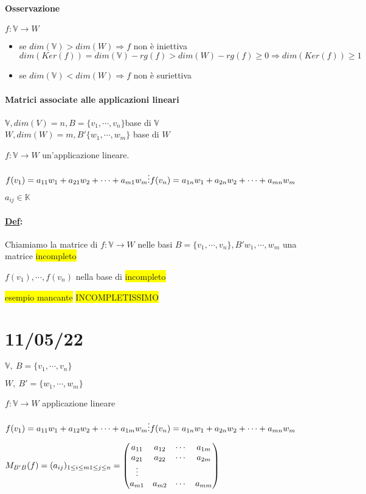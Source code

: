 \documentclass{article}
\newcommand{\hl}[1]{\colorbox{yellow}{#1}}
\newcommand{\ul}[1]{\underline{#1}}
\newcommand{\K}{\mathbb{K}}
\newcommand{\V}{\mathbb{V}}
\newcommand{\Def}[2]{\paragraph{\ul{Def}:}#1\\\hspace*{3em}\begin{minipage}{.8\textwidth}#2\end{minipage}}
\begin{document}
\paragraph{Osservazione}

$f:\V\rightarrow W$
\begin{itemize}
	\item se $dim(\V)>dim(W)\Rightarrow f$ non è iniettiva\\
	      $dim(Ker(f))=dim(\V)-rg(f)>dim(W)-rg(f)\ge0\Rightarrow dim(Ker(f))\ge1$
	\item se $dim(\V)<dim(W)\Rightarrow f$ non è suriettiva
\end{itemize}

\paragraph{Matrici associate alle applicazioni lineari}

$\V,dim(V)=n,B=\{v_1,\cdots,v_n\}$base di $\V$\\$W,dim(W)=m,B'\{w_1,\cdots,w_m\}$ base di $W$

$f:\V\rightarrow W$ un'applicazione lineare.

$f(v_1)=a_{11}w_1+a_{21}w_2+\cdots+a_{m1}w_m\\
\vdots\\
f(v_n)=a_{1n}w_1+a_{2n}w_2+\cdots+a_{mn}w_m$

$a_{ij}\in\K$

	\Def{Chiamiamo la matrice di $f:\V\rightarrow W$ nelle basi $B=\{v_1,\cdots,v_n\},B'{w_1,\cdots,w_m}$ una matrice \hl{incompleto}}{
$f(v_1),\cdots,f(v_n)$ nella base di \hl{incompleto}
	}

	\hl{esempio mancante}
	\hl{INCOMPLETISSIMO}
	\section{11/05/22}

$\V,\ B=\{v_1,\cdots,v_n\}$

$W,\ B'=\{w_1,\cdots,w_m\}$

$f:\V\rightarrow W$ applicazione lineare

$f(v_1)=a_{11}w_1+a_{12}w_2+\cdots+a_{1m}w_m
\\\vdots\\
f(v_n)=a_{1n}w_1+a_{2n}w_2+\cdots+a_{mn}w_m$

$M_{B'B}(f)=(a_{ij})_{1\le i\le m\\1\le j\le n}=\begin{pmatrix}
	a_{11} & a_{12} & \cdots & a_{1m} \\
	a_{21} & a_{22} & \cdots & a_{2m} \\
	\vdots                            \\
	a_{m1} & a_{m2} & \cdots & a_{mm}
\end{pmatrix}$
\end{document}
